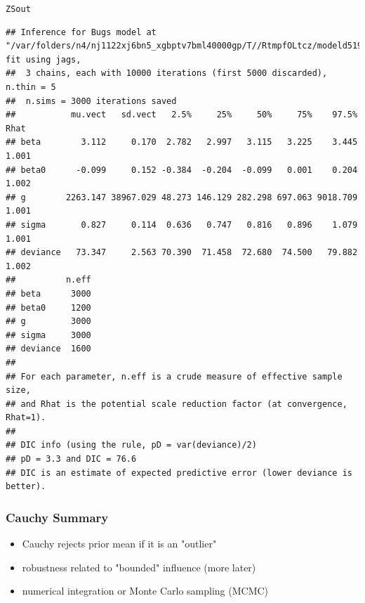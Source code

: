 \documentclass[]{beamer}\usepackage[]{graphicx}\usepackage[]{color}
\makeatletter
\newcommand{\hlstd}[1]{\textcolor[rgb]{0.345,0.345,0.345}{#1}}%
\newenvironment{kframe}{%
 \def\at@end@of@kframe{}%
 \ifinner\ifhmode%
  \def\at@end@of@kframe{\end{minipage}}%
  \begin{minipage}{\columnwidth}%
 \fi\fi%
 \def\FrameCommand##1{\hskip\@totalleftmargin \hskip-\fboxsep
 \colorbox{shadecolor}{##1}\hskip-\fboxsep
     \hskip-\linewidth \hskip-\@totalleftmargin \hskip\columnwidth}%
 \MakeFramed {\advance\hsize-\width
   \@totalleftmargin\z@ \linewidth\hsize
   \@setminipage}}%
 {\par\unskip\endMakeFramed%
 \at@end@of@kframe}
\newenvironment{knitrout}{}{} %
\makeatother
\begin{document}
\begin{frame}[fragile]
\begin{tiny}
\begin{knitrout}
\color{fgcolor}\begin{kframe}
\begin{alltt}
\hlstd{ZSout}
\end{alltt}
\begin{verbatim}
## Inference for Bugs model at "/var/folders/n4/nj1122xj6bn5_xgbptv7bml40000gp/T//RtmpfOLtcz/modeld51989ae1ca.txt", fit using jags,
##  3 chains, each with 10000 iterations (first 5000 discarded), n.thin = 5
##  n.sims = 3000 iterations saved
##           mu.vect   sd.vect   2.5%     25%     50%     75%    97.5%  Rhat
## beta        3.112     0.170  2.782   2.997   3.115   3.225    3.445 1.001
## beta0      -0.099     0.152 -0.384  -0.204  -0.099   0.001    0.204 1.002
## g        2263.147 38967.029 48.273 146.129 282.298 697.063 9018.709 1.001
## sigma       0.827     0.114  0.636   0.747   0.816   0.896    1.079 1.001
## deviance   73.347     2.563 70.390  71.458  72.680  74.500   79.882 1.002
##          n.eff
## beta      3000
## beta0     1200
## g         3000
## sigma     3000
## deviance  1600
## 
## For each parameter, n.eff is a crude measure of effective sample size,
## and Rhat is the potential scale reduction factor (at convergence, Rhat=1).
## 
## DIC info (using the rule, pD = var(deviance)/2)
## pD = 3.3 and DIC = 76.6
## DIC is an estimate of expected predictive error (lower deviance is better).
\end{verbatim}
\end{kframe}
\end{knitrout}
\end{tiny}
\end{frame}

\begin{frame}\frametitle{Cauchy Summary}
\begin{itemize}
\item Cauchy rejects prior mean if it is an "outlier"
\item robustness related to "bounded" influence (more later)
\item numerical integration or Monte Carlo sampling (MCMC)
\end{itemize}
\end{frame}
\end{document}
